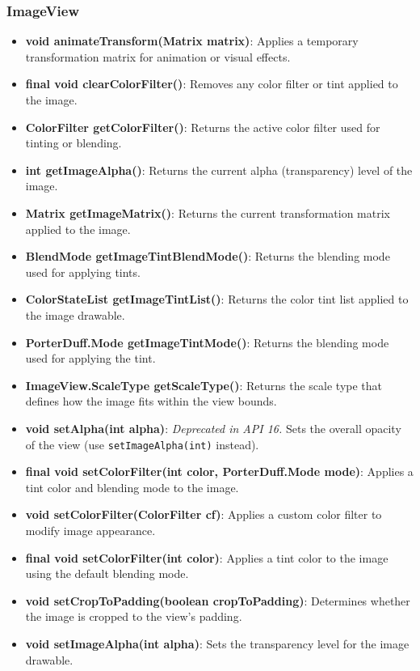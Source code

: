 \documentclass{report}
\begin{document}
\begin{itemize}
    \pagebreak 
    \subsubsection{ImageView}
    \begin{itemize}
        \item \textbf{void animateTransform(Matrix matrix)}: Applies a temporary transformation matrix for animation or visual effects.
        \item \textbf{final void clearColorFilter()}: Removes any color filter or tint applied to the image.
        \item \textbf{ColorFilter getColorFilter()}: Returns the active color filter used for tinting or blending.
        \item \textbf{int getImageAlpha()}: Returns the current alpha (transparency) level of the image.
        \item \textbf{Matrix getImageMatrix()}: Returns the current transformation matrix applied to the image.
        \item \textbf{BlendMode getImageTintBlendMode()}: Returns the blending mode used for applying tints.
        \item \textbf{ColorStateList getImageTintList()}: Returns the color tint list applied to the image drawable.
        \item \textbf{PorterDuff.Mode getImageTintMode()}: Returns the blending mode used for applying the tint.
        \item \textbf{ImageView.ScaleType getScaleType()}: Returns the scale type that defines how the image fits within the view bounds.
        \item \textbf{void setAlpha(int alpha)}: \textit{Deprecated in API 16.} Sets the overall opacity of the view (use \texttt{setImageAlpha(int)} instead).
        \item \textbf{final void setColorFilter(int color, PorterDuff.Mode mode)}: Applies a tint color and blending mode to the image.
        \item \textbf{void setColorFilter(ColorFilter cf)}: Applies a custom color filter to modify image appearance.
        \item \textbf{final void setColorFilter(int color)}: Applies a tint color to the image using the default blending mode.
        \item \textbf{void setCropToPadding(boolean cropToPadding)}: Determines whether the image is cropped to the view’s padding.
        \item \textbf{void setImageAlpha(int alpha)}: Sets the transparency level for the image drawable.

\end{itemize}
\end{itemize}
\end{document}
